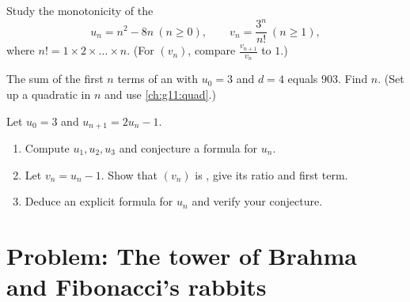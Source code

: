 \begin{exercise}[$\star\star$]\label{exo:g11:seq:9}
Study the monotonicity of the 
\[
u_n = n^2 - 8n \ (n \geq 0), \qquad
v_n = \frac{3^n}{n!}\ (n \geq 1),
\]
where $n! = 1 \times 2 \times \dots \times n$. (For $(v_n)$, compare
$\frac{v_{n+1}}{v_n}$ to $1$.)
\end{exercise}

\begin{exercise}[$\star\star$]\label{exo:g11:seq:10}
The sum of the first $n$ terms of an  with $u_0 = 3$
and $d = 4$ equals $903$. Find $n$. (Set up a quadratic  in $n$
and use \cref{ch:g11:quad}.)
\end{exercise}

\begin{exercise}[$\star\star\star$]\label{exo:g11:seq:11}
Let $u_0 = 3$ and $u_{n+1} = 2u_n - 1$.
\begin{enumerate}
  \item Compute $u_1, u_2, u_3$ and conjecture a formula for $u_n$.
  \item Let $v_n = u_n - 1$. Show that $(v_n)$ is , give its
        ratio and first term.
  \item Deduce an explicit formula for $u_n$ and verify your conjecture.
\end{enumerate}
\end{exercise}

\section{Problem: The tower of Brahma and Fibonacci's rabbits}

